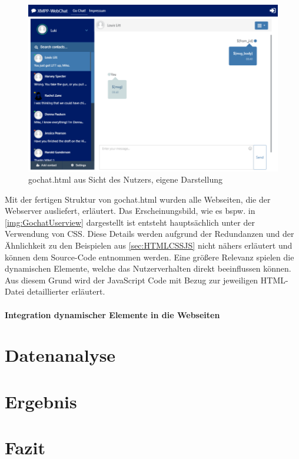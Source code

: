 \documentclass[a4paper,titlepage,halfparskip,12pt]{scrreprt}
\begin{document}
\begin{onehalfspacing}
\begin{figure}[h]
	\centering
	\includegraphics[width=\linewidth]{images/GochatUserAnsicht}
	\caption{gochat.html aus Sicht des Nutzers, eigene Darstellung}
	\label{img:GochatUserview}
\end{figure}
Mit der fertigen Struktur von gochat.html wurden alle Webseiten, die der Webserver ausliefert, erläutert. Das Erscheinungsbild, wie es bspw. in \autoref{img:GochatUserview} dargestellt ist entsteht hauptsächlich unter der Verwendung von \ac{CSS}. Diese Details werden aufgrund der Redundanzen und der Ähnlichkeit zu den Beispielen aus \autoref{sec:HTMLCSSJS} nicht nähers erläutert und können dem Source-Code entnommen werden. Eine größere Relevanz spielen die dynamischen Elemente, welche das Nutzerverhalten direkt beeinflussen können. Aus diesem Grund wird der JavaScript Code mit Bezug zur jeweiligen HTML-Datei detaillierter erläutert.

\subsubsection*{Integration dynamischer Elemente in die Webseiten}
\label{subsubsec:DynamischeElementeWebseiten}

\newpage

\chapter{Datenanalyse}
\label{chap:Datenanalyse}

\newpage

\chapter{Ergebnis}
\label{chap:Ergebnis}

\newpage

\chapter{Fazit}
\label{chap:Fazit}


\end{onehalfspacing}
\newpage
\end{document}
